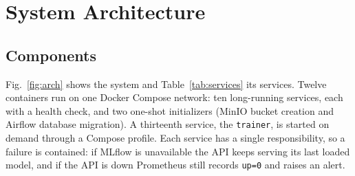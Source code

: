 \documentclass[conference]{IEEEtran}
\newcommand{\code}[1]{\texttt{#1}}
\begin{document}
\section{System Architecture}\label{sec:arch}
\subsection{Components}
Fig.~\ref{fig:arch} shows the system and Table~\ref{tab:services} its services.
Twelve containers run on one Docker Compose network: ten long-running services,
each with a health check, and two one-shot initializers (MinIO bucket creation
and Airflow database migration). A thirteenth service, the \code{trainer}, is
started on demand through a Compose profile. Each service has a single
responsibility, so a failure is contained: if MLflow is unavailable the API keeps
serving its last loaded model, and if the API is down Prometheus still records
\code{up=0} and raises an alert.
\end{document}
